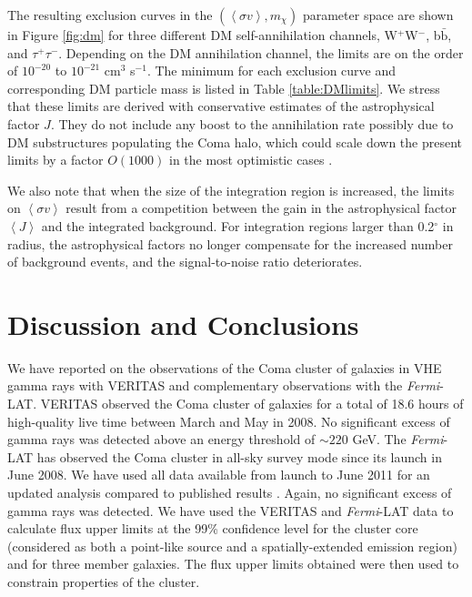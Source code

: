 \documentclass[12pt,manuscript]{aastex}
\newcommand{\expval}[1]{\left\langle #1 \right\rangle}
\begin{document}
The resulting exclusion curves in the $(\expval{\sigma v}, m_{\chi})$ parameter space are shown in
Figure \ref{fig:dm} for three different DM self-annihilation channels, W$^{+}$W$^{-}$,
b$\bar{\mathrm{b}}$, and $\tau^{+}\tau^{-}$. Depending on the
DM annihilation channel, the limits are on the order of
$10^{-20}$ to $10^{-21}$ cm$^{3}$ s$^{-1}$. The
minimum for each exclusion curve and corresponding DM particle mass is listed in Table
\ref{table:DMlimits}. We stress that these limits are derived with conservative estimates of the
astrophysical factor $J$. They do not include any boost to the annihilation rate possibly due to DM
substructures populating the Coma halo, which could scale down the present limits by a factor
$O(1000)$ in the most optimistic cases
\citep{article:PinzkePfrommerBergstrom,article:Gao_etal:2012}.

We also note that when the size of the integration region is increased, the limits on
$\expval{\sigma v}$ result from a competition between the gain in the astrophysical factor
$\expval{J}$ and the integrated background. For integration regions larger than 0.2$^{\circ}$ in
radius, the astrophysical factors no longer compensate for the increased number of background
events, and the signal-to-noise ratio deteriorates.

\section{Discussion and Conclusions}
We have reported on the observations of the Coma cluster of galaxies in VHE gamma rays with VERITAS
and complementary observations with the \emph{Fermi}-LAT. VERITAS observed the Coma cluster of
galaxies for a total of 18.6 hours of high-quality live time between March and May in 2008. No
significant excess of gamma rays was detected above an energy threshold of $\sim 220$ GeV. The
\emph{Fermi}-LAT has observed the Coma cluster in all-sky survey mode since its launch in June
2008. We have used all data available from launch to June 2011 for an updated analysis
compared to
published results \citep{article:Ackermann_etal:2010}. Again, no significant excess of gamma rays
was detected. We have used the VERITAS and \emph{Fermi}-LAT data to calculate flux upper limits at
the 99\% confidence level for the cluster core (considered as both a point-like source and a
spatially-extended emission region) and for three member galaxies. The flux upper limits obtained
were then used to constrain properties of the cluster.
\end{document}
